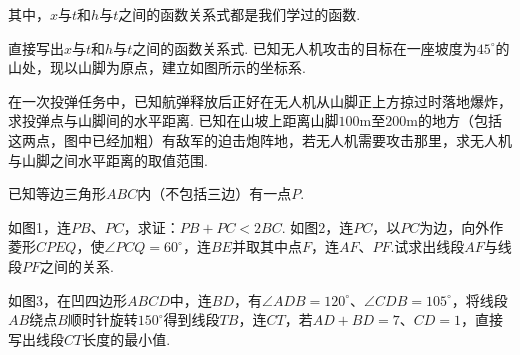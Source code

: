 \documentclass[10pt]{article}
\begin{document}
\begin{questions}{\answeringintroduction}
    \par 其中，$x$与$t$和$h$与$t$之间的函数关系式都是我们学过的函数.
    \begin{subquestions}
        \subquestion 直接写出$x$与$t$和$h$与$t$之间的函数关系式.
        \subquestion 已知无人机攻击的目标在一座坡度为$45^{\circ}$的山处，现以山脚为原点，建立如图所示的坐标系.
        \begin{subsubquestions}
            \subsubquestion 在一次投弹任务中，已知航弹释放后正好在无人机从山脚正上方掠过时落地爆炸，求投弹点与山脚间的水平距离.
            \subsubquestion 已知在山坡上距离山脚$100$m至$200$m的地方（包括这两点，图中已经加粗）有敌军的迫击炮阵地，若无人机需要攻击那里，求无人机与山脚之间水平距离的取值范围.
        \end{subsubquestions}
    \end{subquestions}
    \newpage
    \question %
    \begin{subquestions}
        \subquestion 已知等边三角形$ABC$内（不包括三边）有一点$P$.
        \begin{subsubquestions}
            \subsubquestion 如图1，连$PB$、$PC$，求证：$PB+PC<2BC$.
            \subsubquestion 如图2，连$PC$，以$PC$为边，向外作菱形$CPEQ$，使$\angle PCQ=60^{\circ}$，连$BE$并取其中点$F$，连$AF$、$PF$.试求出线段$AF$与线段$PF$之间的关系.
        \end{subsubquestions}
        \subquestion 如图3，在凹四边形$ABCD$中，连$BD$，有$\angle ADB=120^{\circ}$、$\angle CDB=105^{\circ}$，将线段$AB$绕点$B$顺时针旋转$150^{\circ}$得到线段$TB$，连$CT$，若$AD+BD=7$、$CD=1$，直接写出线段$CT$长度的最小值.
    \end{subquestions}
    \begin{figure}[!htb]
        \centering
        \qquad
\end{figure}
\end{questions}
\end{document}

